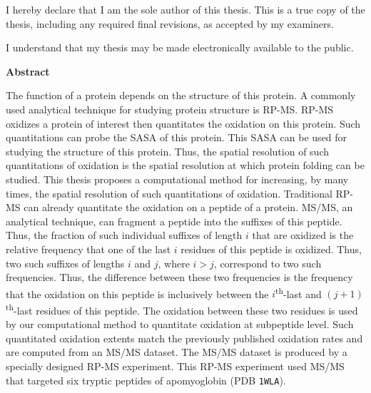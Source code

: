 {%
\pagestyle{plain}
\setcounter{page}{2}

\cleardoublepage %
 


  \noindent
I hereby declare that I am the sole author of this thesis. This is a true copy of the thesis, including any required final revisions, as accepted by my examiners.

  \bigskip
  
  \noindent
I understand that my thesis may be made electronically available to the public.

\cleardoublepage

\begin{center}\textbf{Abstract}\end{center}

The function of a protein depends on the structure of this protein.
A commonly used analytical technique for studying protein structure is \gls{RP-MS}.
\Gls{RP-MS} oxidizes a protein of interest then quantitates the oxidation on this protein.
Such quantitations can probe the \gls{SASA} of this protein.
This \gls{SASA} can be used for studying the structure of this protein.
Thus, the spatial resolution of such quantitations of oxidation is the spatial resolution at which protein folding can be studied.
This thesis proposes a computational method for increasing, by many times, the spatial resolution of such quantitations of oxidation.
Traditional \gls{RP-MS} can already quantitate the oxidation on a peptide of a protein.
\gls{MS/MS}, an analytical technique, can fragment a peptide into the suffixes of this peptide.
Thus, the fraction of such individual suffixes of length \(i\) that are oxidized is the relative frequency that one of the last \(i\) residues of this peptide is oxidized.
Thus, two such suffixes of lengths \(i\) and \(j\), where \(i>j\), correspond to two such frequencies.
Thus, the difference between these two frequencies is the frequency that the oxidation on this peptide is inclusively between the \(i\)\textsuperscript{th}-last and \((j+1)\)\textsuperscript{th}-last residues of this peptide.
The oxidation between these two residues is used by our computational method to quantitate oxidation at subpeptide level.
Such quantitated oxidation extents match the previously published oxidation rates and are computed from an \gls{MS/MS} dataset. 
The \gls{MS/MS} dataset is produced by a specially designed \gls{RP-MS} experiment.
This \gls{RP-MS} experiment used \gls{MS/MS} that targeted six tryptic peptides of apomyoglobin (\gls{PDB} \texttt{1WLA}).

}
